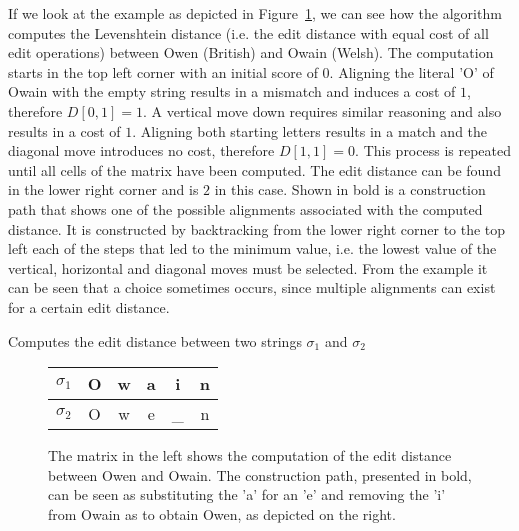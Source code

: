If we look at the example as depicted in Figure~\ref{fig:edit_distance}, we can see how the algorithm computes the Levenshtein distance (i.e. the edit distance with equal cost of all edit operations) between Owen (British) and Owain (Welsh).
The computation starts in the top left corner with an initial score of $0$.
Aligning the literal 'O' of Owain with the empty string results in a mismatch and induces a cost of $1$, therefore $D[0, 1]=1$.
A vertical move down requires similar reasoning and also results in a cost of $1$.
Aligning both starting letters results in a match and the diagonal move introduces no cost, therefore $D[1, 1]=0$.
This process is repeated until all cells of the matrix have been computed.
The edit distance can be found in the lower right corner and is $2$ in this case.
Shown in bold is a construction path that shows one of the possible alignments associated with the computed distance.
It is constructed by backtracking from the lower right corner to the top left each of the steps that led to the minimum value, i.e. the lowest value of the vertical, horizontal and diagonal moves must be selected.
From the example it can be seen that a choice sometimes occurs, since multiple alignments can exist for a certain edit distance.

\begin{algorithm}
    
    \caption{Computes the edit distance between two strings $\sigma_1$ and $\sigma_2$}
    \label{alg:edit_distance}
\end{algorithm}

\begin{figure}
    \centering
    \begin{minipage}{.65\textwidth}
        \centering
        
    \end{minipage}%
    \begin{minipage}{.35\textwidth}
        \centering
        \begin{tabular}{c||c|c|c|c|c}
            $\sigma_1$ & O & w & a & i & n \\\hline
            $\sigma_2$ & O & w & e & \_ & n
        \end{tabular}
    \end{minipage}
    \caption[Example of edit distance]{The matrix in the left shows the computation of the edit distance between Owen and Owain. The construction path, presented in bold, can be seen as substituting the 'a' for an 'e' and removing the 'i' from Owain as to obtain Owen, as depicted on the right.}
    \label{fig:edit_distance}
\end{figure}


